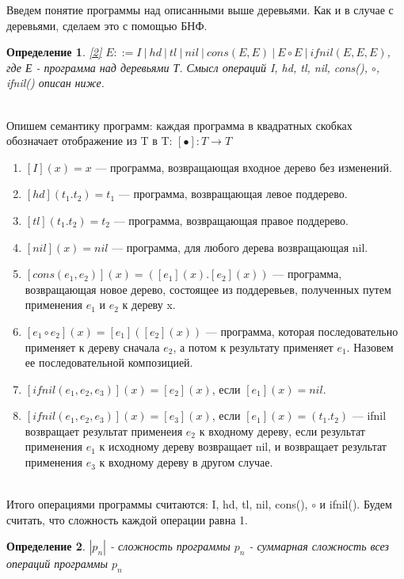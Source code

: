 \documentclass[12pt]{article}
\newtheorem{defn}{Определение}[section]
\begin{document}
Введем понятие программы над описанными выше деревьями. Как и в случае с деревьями, сделаем это с помощью БНФ.\\
\begin{defn} \hyperlink{bibl2}{[2]} $E ::= I \ | \ hd \ | \ tl \ | \ nil \ | \ cons(E, E) \ | \ E \circ E \ | \ ifnil(E, E, E)$, где Е - программа над деревьями Т. Смысл операций I, hd, tl, nil, cons(), $\circ$, ifnil() описан ниже.\end{defn}\\
Опишем семантику программ: каждая программа в квадратных скобках обозначает отображение из T в T: $[\bullet]: T \rightarrow T$
\begin{enumerate}
	\item $[I](x) = x$ --- программа, возвращающая входное дерево без изменений.
	\item $[hd](t_{1}. t_{2}) = t_{1}$ --- программа, возвращающая левое поддерево.
	\item $[tl](t_{1}. t_{2}) = t_{2}$ --- программа, возвращающая правое поддерево.
	\item $[nil](x) = nil$ --- программа, для любого дерева возвращающая nil.
	\item $[cons(e_{1}, e_{2})](x) = ([e_{1}](x). [e_{2}](x))$ --- программа, возвращающая новое дерево, состоящее из поддеревьев, полученных путем применения $e_{1}$ и $e_{2}$ к дереву x.
	\item $[e_{1} \circ e_{2}](x) = [e_{1}]([e_{2}](x))$ --- программа, которая последовательно применяет к дереву сначала $e_{2}$, а потом к результату применяет $e_{1}$. Назовем ее последовательной композицией.
	\item $[ifnil(e_{1}, e_{2}, e_{3})](x) = [e_{2}](x)$, если $[e_{1}](x) = nil$.
	\item $[ifnil(e_{1}, e_{2}, e_{3})](x) = [e_{3}](x)$, если $[e_{1}](x) = (t_{1}. t_{2})$ --- ifnil возвращает результат применеия $e_{2}$ к входному дереву, если результат применения $e_{1}$ к исходному дереву возвращает nil, и возвращает результат применения $e_{3}$ к входному дереву в другом случае.
\end{enumerate}\\
Итого операциями программы считаются: I, hd, tl, nil, cons(), $\circ$ и ifnil(). Будем считать, что сложность каждой операции равна 1.\\
\begin{defn} $|p_{n}|$ - сложность программы $p_{n}$ - суммарная сложность всез операций программы $p_{n}$ \end{defn}\\
\end{document}
